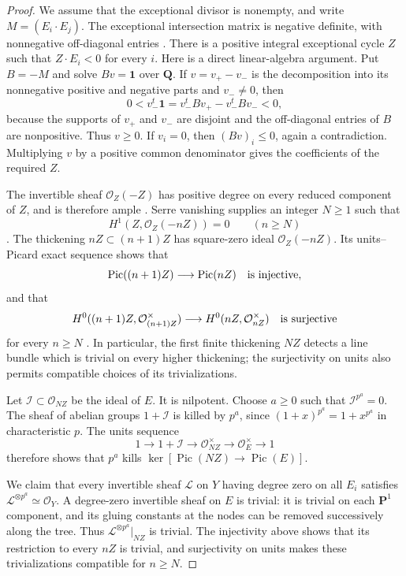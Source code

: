 \begin{proof}
We assume that the exceptional divisor is nonempty, and write
$M=(E_i\cdot E_j)$.  The exceptional intersection matrix is negative
definite, with nonnegative off-diagonal entries
\cite[Section 10.1]{Kollar2013D}.
There is a positive integral exceptional cycle $Z$ such that
$Z\cdot E_i<0$ for every $i$.  Here is a direct linear-algebra argument.
Put $B=-M$ and solve $Bv=\mathbf1$ over $\mathbf Q$.
If $v=v_+-v_-$ is the decomposition into its nonnegative positive and
negative parts and $v_-\ne0$, then
\[
 0<v_-^t\mathbf1=v_-^tBv_+-v_-^tBv_-<0,
\]
because the supports of $v_+$ and $v_-$ are disjoint and the off-diagonal
entries of $B$ are nonpositive.  Thus $v\geq0$.
If $v_i=0$, then $(Bv)_i\leq0$, again a contradiction.
Multiplying $v$ by a positive common denominator gives the coefficients
of the required $Z$.

The invertible sheaf $\mathcal O_Z(-Z)$ has positive degree on every
reduced component of $Z$, and is therefore ample
\cite[Lemma 33.44.15, tag 0B5Y]{C_StacksFormalPic}.
Serre vanishing supplies an integer $N\geq1$ such that
\[
 H^1(Z,\mathcal O_Z(-nZ))=0\qquad(n\geq N)
\]
\cite[Lemma 30.17.1, tag 0B5U]{C_StacksFormalPic}.
The thickening $nZ\subset(n+1)Z$ has square-zero ideal
$\mathcal O_Z(-nZ)$.  Its units--Picard exact sequence shows that
\[
 \operatorname{Pic}((n+1)Z)\longrightarrow\operatorname{Pic}(nZ)
 \quad\hbox{is injective},
\]
and that
\[
 H^0((n+1)Z,\mathcal O_{(n+1)Z}^{\times})
   \longrightarrow H^0(nZ,\mathcal O_{nZ}^{\times})
 \quad\hbox{is surjective}
\]
for every $n\geq N$
\cite[Lemma 37.4.1, tag 0C6R]{C_StacksFormalPic}.
In particular, the first finite thickening $NZ$ detects a line bundle
which is trivial on every higher thickening; the surjectivity on units
also permits compatible choices of its trivializations.

Let $\mathcal I\subset\mathcal O_{NZ}$ be the ideal of $E$.
It is nilpotent.  Choose $a\geq0$ such that
$\mathcal I^{p^a}=0$.  The sheaf of abelian groups $1+\mathcal I$
is killed by $p^a$, since $(1+x)^{p^a}=1+x^{p^a}$ in characteristic $p$.
The units sequence
\[
 1\longrightarrow1+\mathcal I\longrightarrow
 \mathcal O_{NZ}^{\times}\longrightarrow\mathcal O_E^{\times}
 \longrightarrow1
\]
therefore shows that $p^a$ kills
$\ker[\operatorname{Pic}(NZ)\to\operatorname{Pic}(E)]$.

We claim that every invertible sheaf $\mathcal L$ on $Y$ having
degree zero on all $E_i$ satisfies $\mathcal L^{\otimes p^a}\simeq
\mathcal O_Y$.  A degree-zero invertible sheaf on $E$ is trivial:
it is trivial on each $\mathbf P^1$ component, and its gluing constants
at the nodes can be removed successively along the tree.
Thus $\mathcal L^{\otimes p^a}|_{NZ}$ is trivial.  The injectivity
above shows that its restriction to every $nZ$ is trivial, and
surjectivity on units makes these trivializations compatible for
$n\geq N$.


\end{proof}
